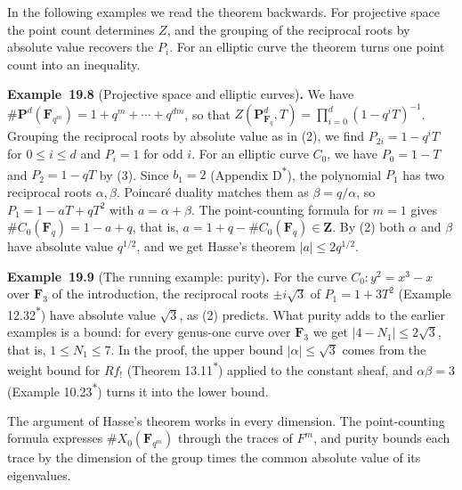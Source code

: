 \documentclass[11pt]{article}
\newenvironment{bpstatement}[2]{\par\addvspace{0.6\baselineskip}\noindent\textbf{#1}#2\textbf{.}\enspace\ignorespaces}
  {\par\addvspace{0.4\baselineskip}}
\newcommand{\bpout}[1]{#1\textsuperscript{\hyperlink{bp-outside}{\ensuremath{\ast}}}}
\begin{document}
\label{bp26}%
In the following examples we read the theorem backwards. For projective space the point count determines \(Z\), and the grouping of the reciprocal roots by absolute value recovers the \(P_i\). For an elliptic curve the theorem turns one point count into an inequality.

\label{bp27}%
\begin{bpstatement}{Example~19.8}{ (Projective space and elliptic curves)}
We have \(\#\mathbf P^d(\mathbf F_{q^m})=1+q^m+\cdots+q^{dm}\), so that \(Z(\mathbf P^d_{\mathbf F_q},T)=\prod_{i=0}^d(1-q^iT)^{-1}\). Grouping the reciprocal roots by absolute value as in (2), we find \(P_{2i}=1-q^iT\) for \(0\le i\le d\) and \(P_i=1\) for odd \(i\). For an elliptic curve \(C_0\), we have \(P_0=1-T\) and \(P_2=1-qT\) by (3). Since \(b_1=2\) (Appendix \bpout{D}), the polynomial \(P_1\) has two reciprocal roots \(\alpha,\beta\). Poincaré duality matches them as \(\beta=q/\alpha\), so \(P_1=1-aT+qT^2\) with \(a=\alpha+\beta\). The point-counting formula for \(m=1\) gives \(\#C_0(\mathbf F_q)=1-a+q\), that is, \(a=1+q-\#C_0(\mathbf F_q)\in\mathbf Z\). By (2) both \(\alpha\) and \(\beta\) have absolute value \(q^{1/2}\), and we get Hasse's theorem \(|a|\le2q^{1/2}\).
\end{bpstatement}

\label{bp28}%
\begin{bpstatement}{Example~19.9}{ (The running example: purity)}
For the curve \(C_0\colon y^2=x^3-x\) over \(\mathbf F_3\) of the introduction, the reciprocal roots \(\pm i\sqrt3\) of \(P_1=1+3T^2\) (Example \bpout{12.32}) have absolute value \(\sqrt3\), as (2) predicts. What purity adds to the earlier examples is a bound: for every genus-one curve over \(\mathbf F_3\) we get \(|4-N_1|\le2\sqrt3\), that is, \(1\le N_1\le7\). In the proof, the upper bound \(|\alpha|\le\sqrt3\) comes from the weight bound for \(Rf_!\) (Theorem \bpout{13.11}) applied to the constant sheaf, and \(\alpha\beta=3\) (Example \bpout{10.23}) turns it into the lower bound.
\end{bpstatement}

\label{bp29}%
The argument of Hasse's theorem works in every dimension. The point-counting formula expresses \(\#X_0(\mathbf F_{q^m})\) through the traces of \(F^m\), and purity bounds each trace by the dimension of the group times the common absolute value of its eigenvalues.
\end{document}
